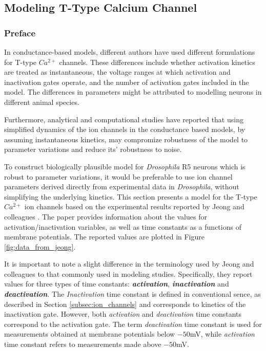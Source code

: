 \documentclass[../main.tex]{subfiles}
\begin{document}
\subsection{Modeling T-Type Calcium Channel} \label{sec:modeling_t_type_channel}

\subsubsection{Preface} \label{subsec:model_t_type_preface}

In conductance-based models, different authors have used different formulations for T-type $Ca^{2+}$ channels. These differences include whether activation kinetics are treated as instantaneous, the voltage ranges at which activation and inactivation gates operate, and the number of activation gates included in the model. The differences in parameters might be attributed to modelling neurons in different animal species.

Furthermore, analytical and computational studies have reported that using simplified dynamics of the ion channels in the conductance based models, by assuming instantaneous kinetics, may compromize robustness of the model to parameter variations and reduce its' robustness to noise. %

To construct biologically plausible model for \textit{Drosophila} R5 neurons which is robust to parameter variations, it would be preferable to use ion channel parameters derived directly from experimental data in \textit{Drosophila}, without simplifying the underlying kinetics.
This section presents a model for the T-type $Ca^{2+}$ ion channels based on the experimental results reported by Jeong and colleagues \parencite{jeongCaa1TFlyTtype2015}. The paper provides
information about the values for activation/inactivation variables, as well as time constants
as a functions of membrane potentials. The reported values are plotted in Figure \ref{fig:data_from_jeong}.

It is important to note a slight difference in the terminology used by Jeong and colleagues to that commonly used in modeling studies. Specifically, they report values for three types of time constants: \textbf{\textit{activation}}, \textbf{\textit{inactivation}} and \textbf{\textit{deactivation}}. The \textit{Inactivation} time constant is defined in conventional sence, as described in Section \ref{subsec:ion_channels} and corresponds to kinetics of the inactivation gate. However, both \textit{activation} and \textit{deactivation} time constants correspond to the activation gate. The term \textit{deactivation} time constant is used for measurements obtained at membrane potentials below $-50$mV, while \textit{activation} time constant refers to measurements made above $-50$mV.
\end{document}
